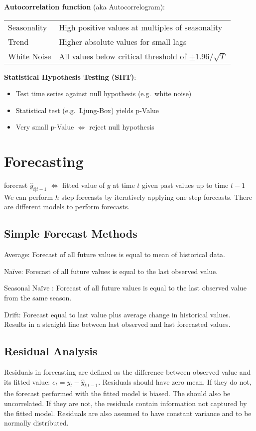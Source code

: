 \begin{minipage}[t]{0.5\textwidth}
\textbf{Autocorrelation function} (aka Autocorrelogram):\\
\begin{tabular}{ll}
    Seasonality & High positive values at multiples of seasonality \\
    Trend & Higher absolute values for small lags \\
    White Noise & All values below critical threshold of \(\pm 1.96 / \sqrt{T}\) \\
\end{tabular}
\end{minipage}
\hfill
\begin{minipage}[t]{0.46\textwidth}
\textbf{Statistical Hypothesis Testing (SHT)}:
\begin{itemize}
    \item Test time series against null hypothesis (e.g.\ white noise)
    \item Statistical test (e.g.\ Ljung-Box) yields p-Value
    \item Very small p-Value \(\Leftrightarrow\) reject null hypothesis
\end{itemize}
\end{minipage}


\section{Forecasting}
forecast $ \hat{y}_{t|t-1} $ $\Leftrightarrow$ fitted value of $ y $ at time $ t $ given past values up to time $ t - 1 $
We can perform $h$ step forecasts by iteratively applying one step forecasts.
There are different models to perform forecasts.

\subsection{Simple Forecast Methods}
Average: Forecast of all future values is equal to mean of historical data.

Naïve: Forecast of all future values is equal to the last observed value.

Seasonal Naïve : Forecast of all future values is equal to the last observed value from the same season.

Drift: Forecast equal to last value plus average change in historical values. Results in a straight line between last observed and last forecasted values.

\subsection{Residual Analysis}
Residuals in forecasting are defined as the difference between observed value and its fitted value: $ e_t = y_t - \hat{y}_{t|t-1} $.
Residuals should have zero mean. If they do not, the forecast performed with the fitted model is biased. The should also be uncorrelated.
If they are not, the residuals contain information not captured by the fitted model. Residuals are also assumed to have constant variance and to be normally distributed.

